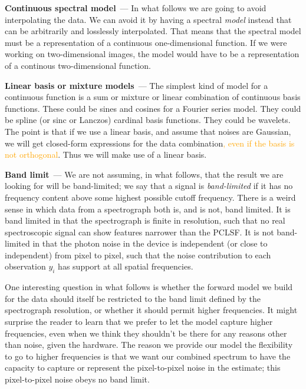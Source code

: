 \documentclass[modern, linenumbers]{aastex631}
\renewcommand{\paragraph}[1]{\medskip\par\noindent\textbf{#1}~---}
\newcommand{\modified}[1]{\textcolor{orange}{#1}}
\begin{document}
\paragraph{Continuous spectral model} 
In what follows we are going to avoid interpolating the data.
We can avoid it by having a spectral \emph{model} instead that can be arbitrarily and losslessly interpolated.
That means that the spectral model must be a representation of a continuous one-dimensional function.
If we were working on two-dimensional images, the model would have to be a representation of a continous two-dimensional function.

\paragraph{Linear basis or mixture models}
The simplest kind of model for a continuous function is a sum or mixture or linear combination of continuous basis functions.
These could be sines and cosines for a Fourier series model.
They could be spline (or sinc or Lanczos) cardinal basis functions.
They could be wavelets.
The point is that if we use a linear basis, and assume that noises are Gaussian, we will get closed-form expressions for the data combination\modified{, even if the basis is not orthogonal}.
Thus we will make use of a linear basis.

\paragraph{Band limit}
We are not assuming, in what follows, that the result we are looking for will be band-limited;
we say that a signal is \emph{band-limited} if it has no frequency content above some highest possible cutoff frequency.
There is a weird sense in which data from a spectrograph both is, and is not, band limited.
It is band limited in that the spectrograph is finite in resolution, such that no real spectroscopic signal can show features narrower than the PCLSF.
It is not band-limited in that the photon noise in the device is independent (or close to independent) from pixel to pixel, such that the noise contribution to each observation $y_i$ has support at all spatial frequencies.

One interesting question in what follows is whether the forward model we build for the data should itself be restricted to the band limit defined by the spectrograph resolution, or whether it should permit higher frequencies.
It might surprise the reader to learn that we prefer to let the model capture higher frequencies, even when we think they shouldn't be there for any reasons other than noise, given the hardware.
The reason we provide our model the flexibility to go to higher frequencies is that we want our combined spectrum to have the capacity to capture or represent the pixel-to-pixel noise in the estimate; this pixel-to-pixel noise obeys no band limit.
\end{document}
